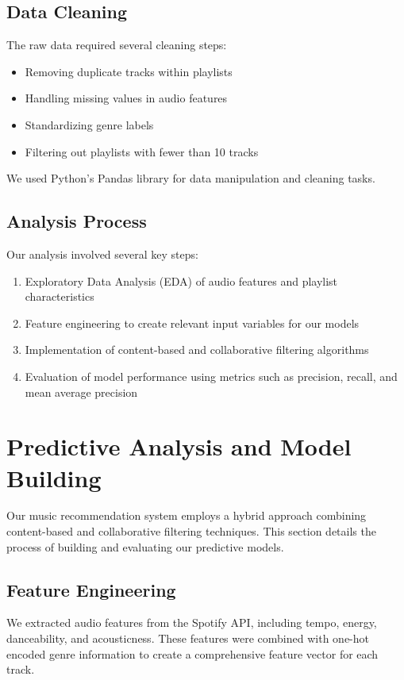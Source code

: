 \documentclass[runningheads]{llncs}
\begin{document}
\subsection{Data Cleaning}
The raw data required several cleaning steps:
\begin{itemize}
    \item Removing duplicate tracks within playlists
    \item Handling missing values in audio features
    \item Standardizing genre labels
    \item Filtering out playlists with fewer than 10 tracks
\end{itemize}

We used Python's Pandas library for data manipulation and cleaning tasks.

\subsection{Analysis Process}
Our analysis involved several key steps:
\begin{enumerate}
    \item Exploratory Data Analysis (EDA) of audio features and playlist characteristics
    \item Feature engineering to create relevant input variables for our models
    \item Implementation of content-based and collaborative filtering algorithms
    \item Evaluation of model performance using metrics such as precision, recall, and mean average precision
\end{enumerate}

\section{Predictive Analysis and Model Building}

Our music recommendation system employs a hybrid approach combining content-based and collaborative filtering techniques. This section details the process of building and evaluating our predictive models.

\subsection{Feature Engineering}

We extracted audio features from the Spotify API, including tempo, energy, danceability, and acousticness. These features were combined with one-hot encoded genre information to create a comprehensive feature vector for each track.
\end{document}

